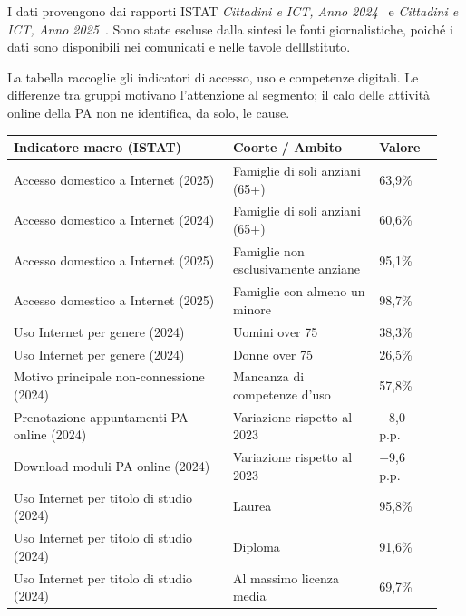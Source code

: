 I dati provengono dai rapporti ISTAT \emph{Cittadini e ICT, Anno 2024}~\cite{istatICT2024}
e \emph{Cittadini e ICT, Anno 2025}~\cite{istatICT2025}. Sono state escluse dalla sintesi le fonti
giornalistiche, poiché i dati sono disponibili nei comunicati e nelle
tavole dell\textquotesingle Istituto.

La tabella raccoglie gli indicatori di accesso, uso e competenze digitali.
Le differenze tra gruppi motivano l'attenzione al segmento; il calo delle
attività online della PA non ne identifica, da solo, le cause.

\begin{center}
\begin{minipage}{\linewidth}
\centering
{}\label{tab:a-1}
\small
\noindent\begin{tabular}{@{}p{0.48\linewidth}p{0.32\linewidth}p{0.14\linewidth}@{}}
\toprule
\textbf{Indicatore macro (ISTAT)} & \textbf{Coorte / Ambito} & \textbf{Valore} \\
\midrule
Accesso domestico a Internet (2025) & Famiglie di soli anziani (65+) & 63,9\% \\
Accesso domestico a Internet (2024) & Famiglie di soli anziani (65+) & 60,6\% \\
Accesso domestico a Internet (2025) & Famiglie non esclusivamente anziane & 95,1\% \\
Accesso domestico a Internet (2025) & Famiglie con almeno un minore & 98,7\% \\
Uso Internet per genere (2024) & Uomini over 75 & 38,3\% \\
Uso Internet per genere (2024) & Donne over 75 & 26,5\% \\
Motivo principale non-connessione (2024) & Mancanza di competenze d'uso & 57,8\% \\
Prenotazione appuntamenti PA online (2024) & Variazione rispetto al 2023 & $-$8,0 p.p. \\
Download moduli PA online (2024) & Variazione rispetto al 2023 & $-$9,6 p.p. \\
Uso Internet per titolo di studio (2024) & Laurea & 95,8\% \\
Uso Internet per titolo di studio (2024) & Diploma & 91,6\% \\
Uso Internet per titolo di studio (2024) & Al massimo licenza media & 69,7\% \\
\bottomrule
\end{tabular}
\end{minipage}
\end{center}

